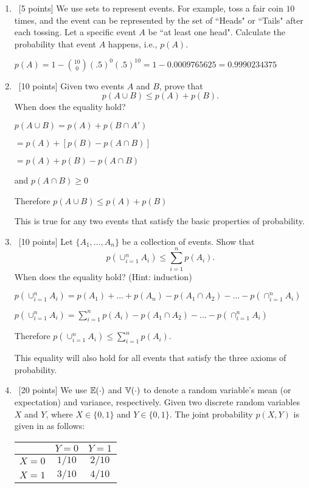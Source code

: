 \documentclass[12pt, fullpage,letterpaper]{article}
\begin{document}
%
\begin{enumerate}
\item~[5 points] We use sets to represent events. For example, toss a fair coin $10$ times, and the event can be represented by the set of ``Heads" or ``Tails" after each tossing. Let a specific event $A$ be ``at least one head". Calculate the probability that event $A$ happens, i.e., $p(A)$.

$p(A) = 1 - \binom{10}{0}(.5)^0(.5)^{10} = 1 - 0.0009765625 = 0.9990234375$

\item~[10 points] Given two events $A$ and $B$, prove that 
\[
p(A \cup B) \le p(A) + p(B).
\]
When does the equality hold?

$p(A \cup B) = p(A) + p(B \cap A') $

$= p(A) + [p(B) - p(A \cap B)]$

$= p(A) + p(B) - p(A \cap B)$

and $p(A \cap B) \ge 0$

Therefore $p(A \cup B) \le p(A) + p(B)$

This is true for any two events that satisfy the basic properties of probability.

\item~[10 points] Let $\{A_1, \ldots, A_n\}$ be a collection of events. Show that
\[
p(\cup_{i=1}^n A_i) \le \sum_{i=1}^n p(A_i).
\]
When does the equality hold? (Hint: induction)

$p(\cup_{i=1}^n A_i) = p(A_1) + ... + p(A_n) - p(A_1 \cap A_2) - ... - p(\cap_{i=1}^n A_i)$

$p(\cup_{i=1}^n A_i) = \sum_{i=1}^n p(A_i) - p(A_1 \cap A_2) - ... - p(\cap_{i=1}^n A_i)$

Therefore $p(\cup_{i=1}^n A_i) \le \sum_{i=1}^n p(A_i).$

This equality will also hold for all events that satisfy the three axioms of probability.

\item~[20 points]  We use $\mathbb{E}(\cdot)$ and $\mathbb{V}(\cdot)$ to denote a random variable's mean (or expectation) and variance, respectively. Given two discrete random variables $X$ and $Y$, where $X \in \{0, 1\}$ and $Y \in \{0,1\}$. The joint probability $p(X,Y)$ is given in as follows:
\begin{table}[h]
        \centering
        \begin{tabular}{ccc}
        \hline\hline
         & $Y=0$ & $Y=1$ \\ \hline
         $X=0$ & $1/10$ & $2/10$ \\ \hline
         $X=1$  & $3/10$ & $4/10$ \\ \hline\hline
        \end{tabular}
        \end{table}
	

\end{enumerate}
\end{document}
